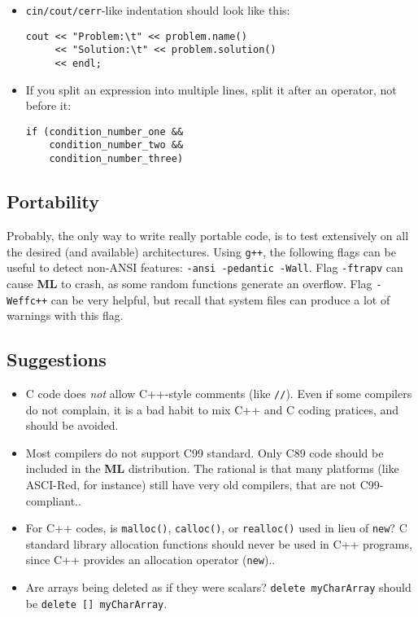 \documentclass[10pt,letter,relax]{SANDreport}
\newcommand{\ML}     {{\bf ML }}
\begin{document}
\begin{itemize}
  \begin{verbatim}
  ML_function(int FirstParameter,     // No!
    int SecondParamete, int ThirdParameter)
  {
    ..
  }

  ML_function(                        // No!
    int FirstParameter,
    int SecondParamete,
    int ThirdParameter
  ) {
    ..
  }    

  ML_function(int FirstParameter, int SecondParameter,  // Yes
              int ThirdParameter)
  {
    ...
  }      
  \end{verbatim}
\item \verb!cin/cout/cerr!-like indentation should look like this:
\begin{verbatim}
cout << "Problem:\t" << problem.name()
     << "Solution:\t" << problem.solution()
     << endl;
\end{verbatim}
\item If you split an expression into multiple lines, split it after an operator, not before it:
\begin{verbatim}
if (condition_number_one &&
    condition_number_two &&
    condition_number_three)
\end{verbatim}
\end{itemize}

\subsection{Portability}

Probably, the only way to write really portable code, is to test
extensively on all the desired (and available) architectures. Using
\verb!g++!, the following flags can be useful to detect non-ANSI
features: \verb!-ansi -pedantic -Wall!. Flag \verb!-ftrapv! can cause
\ML to crash, as some random functions generate an overflow. Flag
\verb!-Weffc++! can be very helpful, but recall that system files can
produce a lot of warnings with this flag.

\subsection{Suggestions}

\begin{itemize}
\item C code does {\sl not} allow C++-style comments (like
  \verb!//!). Even if some compilers do not complain, it is a bad
  habit to mix C++ and C coding pratices, and should be avoided.
\item Most compilers do not support C99 standard. Only C89 code should
  be included in the \ML distribution. The rational is that many
  platforms (like ASCI-Red, for instance) still have very old compilers,
  that are not C99-compliant..
\item For C++ codes, is \verb!malloc()!, \verb!calloc()!, or
  \verb!realloc()! used in lieu of \verb!new!?  C standard library
  allocation functions should never be used in C++ programs, since C++
  provides an allocation operator (\verb!new!)..
\item Are arrays being deleted as if they were scalars?  {\tt delete
    myCharArray} should be {\tt delete [] myCharArray}.
\end{itemize}
\end{document}
